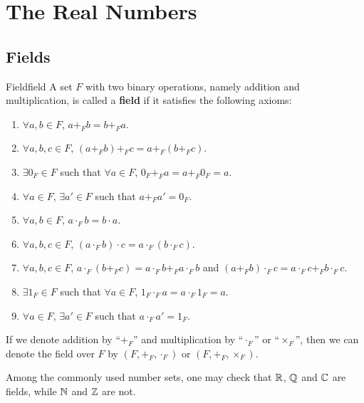 \documentclass[math]{amznotes}
\theoremstyle{remark}
\begin{document}
\tableofcontents

\chapter{The Real Numbers}
\section{Fields}
\begin{dfnbox}{Field}{field}
    A set $F$ with two binary operations, namely addition and multiplication, is called a {\color{red} \textbf{field}} if it satisfies the following axioms:
    \begin{enumerate}
        \item $\forall a, b \in F$, $a +_F b = b +_F a$.
        \item $\forall a, b, c \in F$, $(a +_F b) +_F c = a +_F (b +_F c)$.
        \item $\exists 0_F \in F$ such that $\forall a \in F$, $0_F +_F a = a +_F 0_F = a$.
        \item $\forall a \in F$, $\exists a' \in F$ such that $a +_F a' = 0_F$.
        \item $\forall a, b \in F$, $a \cdot_F b = b \cdot a$.
        \item $\forall a, b, c \in F$, $(a \cdot_F b) \cdot c = a \cdot_F (b \cdot_F c)$.
        \item $\forall a, b, c \in F$, $a \cdot_F (b +_F c) = a \cdot_F b +_F a \cdot_F b$ and $(a +_F b) \cdot_F c = a \cdot_F c +_F b \cdot_F c$.
        \item $\exists 1_F \in F$ such that $\forall a \in F$, $1_F \cdot_F a = a \cdot_F 1_F = a$.
        \item $\forall a \in F$, $\exists a' \in F$ such that $a \cdot_F a' = 1_F$.
    \end{enumerate}
\end{dfnbox}
If we denote addition by ``$+_F$'' and multiplication by ``$\cdot_F$'' or ``$\times_F$'', then we can denote the field over $F$ by $(F, +_F, \cdot_F)$ or $(F, +_F, \times_F)$.

Among the commonly used number sets, one may check that $\mathbb{R}$, $\mathbb{Q}$ and $\mathbb{C}$ are fields, while $\mathbb{N}$ and $\mathbb{Z}$ are not.
\end{document}
